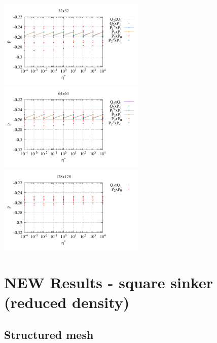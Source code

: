 \begin{center}
\includegraphics[width=7cm]{python_codes/fieldstone_120/paperresults/sinker/structured/sinker_press_32}\\
\includegraphics[width=7cm]{python_codes/fieldstone_120/paperresults/sinker/structured/sinker_press_64}
\includegraphics[width=7cm]{python_codes/fieldstone_120/paperresults/sinker/structured/sinker_press_128}
\end{center}


\newpage
\section*{NEW Results - square sinker (reduced density)}


\subsection*{Structured mesh}

